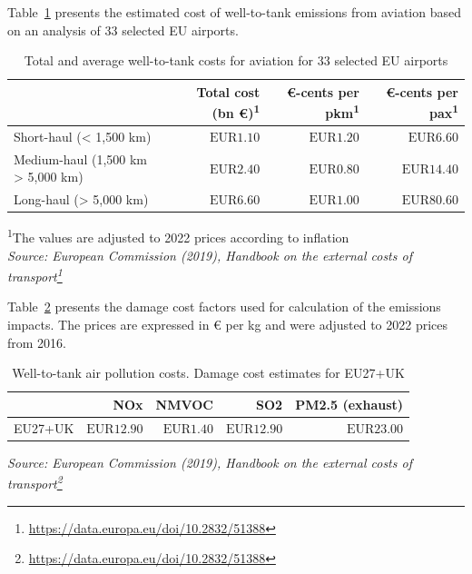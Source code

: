 \documentclass[
  11pt,
  a4paper,
]{book}
\DeclareRobustCommand{\href}[2]{#2\footnote{\url{#1}}}
\begin{document}
Table~\ref{tbl-wtt-costs} presents the estimated cost of well-to-tank
emissions from aviation based on an analysis of 33 selected EU airports.

\hypertarget{tbl-wtt-costs}{}
\setlength{\LTpost}{0mm}
\begin{longtable}{lrrr}
\caption{\label{tbl-wtt-costs}Total and average well-to-tank costs for aviation for 33 selected EU
airports }\tabularnewline

\toprule
  & Total cost (bn €)\textsuperscript{1} & €-cents per pkm\textsuperscript{1} & €-cents per pax\textsuperscript{1} \\ 
\midrule
Short-haul (< 1,500 km) & $\text{EUR}1.10$ & $\text{EUR}1.20$ & $\text{EUR}6.60$ \\ 
Medium-haul (1,500 km > 5,000 km) & $\text{EUR}2.40$ & $\text{EUR}0.80$ & $\text{EUR}14.40$ \\ 
Long-haul (> 5,000 km) & $\text{EUR}6.60$ & $\text{EUR}1.00$ & $\text{EUR}80.60$ \\ 
\bottomrule
\end{longtable}
\begin{minipage}{\linewidth}
\textsuperscript{1}The values are adjusted to 2022 prices according to inflation\\
\emph{Source: \href{https://data.europa.eu/doi/10.2832/51388}{European Commission (2019), Handbook on the external costs of transport}}\\
\end{minipage}

Table~\ref{tbl-wtt-pollution} presents the damage cost factors used for
calculation of the emissions impacts. The prices are expressed in € per
kg and were adjusted to 2022 prices from 2016.

\hypertarget{tbl-wtt-pollution}{}
\setlength{\LTpost}{0mm}
\begin{longtable}{lrrrr}
\caption{\label{tbl-wtt-pollution}Well-to-tank air pollution costs. Damage cost estimates for EU27+UK }\tabularnewline

\toprule
  & NOx & NMVOC & SO2 & PM2.5 (exhaust) \\ 
\midrule
EU27+UK & $\text{EUR}12.90$ & $\text{EUR}1.40$ & $\text{EUR}12.90$ & $\text{EUR}23.00$ \\ 
\bottomrule
\end{longtable}
\begin{minipage}{\linewidth}
\emph{Source: \href{https://data.europa.eu/doi/10.2832/51388}{European Commission (2019), Handbook on the external costs of transport}}\\
\end{minipage}
\end{document}
